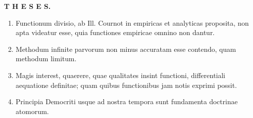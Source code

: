 \begingroup\small
\begin{center}
{\large\bfseries T H E S E S. \textbullet}
\end{center}

\begin{enumerate}
\renewcommand{\labelenumi}{\Roman{enumi}.}
\item Functionum divisio, ab Ill. Cournot in empiricas et analyticas proposita, non apta videatur esse, quia functiones empiricae omnino non dantur.
\item Methodum infinite parvorum non minus accuratam esse contendo, quam methodum limitum.
\item Magis interest, quaerere, quae qualitates insint functioni, differentiali aequatione definitae; quam quibus functionibus jam notis exprimi possit.
\item Principia Democriti usque ad nostra tempora sunt fundamenta doctrinae atomorum.
\end{enumerate}

\GordanOrnament
\endgroup
